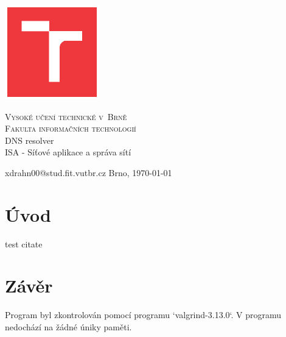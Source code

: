 \documentclass[a4paper,11pt]{article}
\begin{document}
\begin{titlepage}

	\begin{center}

        \includegraphics[width=4.1cm,keepaspectratio,trim={1.2cm 1.2cm 1.2cm 1.2cm},clip]{./template-fig/VUT_symbol_barevne_CMYK_CZ}%

		{\Huge\textsc{Vysoké učení technické v~Brně}}\\
		\medskip
		{\huge\textsc{Fakulta informačních technologií}}\\
		{\huge DNS resolver}\\
		\medskip
		{\LARGE ISA - Síťové aplikace a správa sítí}\\
	\end{center}

    \noindent xdrahn00@stud.fit.vutbr.cz \Large {\hfill Brno, \today}

\end{titlepage}

\section{Úvod}

test citate \cite{test_citate}

\section{Závěr}

Program byl zkontrolován pomocí programu `valgrind-3.13.0`. V programu nedochází na žádné úniky paměti.

\newpage




\end{document}
